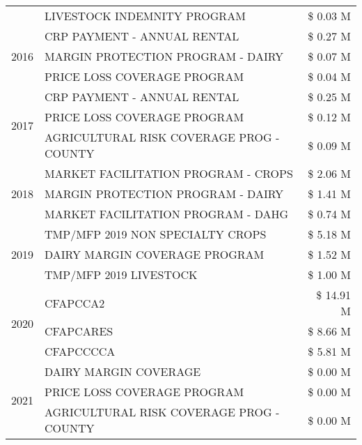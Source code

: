 \begin{tabular}{llr}
 & LIVESTOCK INDEMNITY PROGRAM & \$ 0.03 M \\
\cline{1-3}
\multirow[t]{3}{*}{2016} & CRP PAYMENT - ANNUAL RENTAL & \$ 0.27 M \\
 & MARGIN PROTECTION PROGRAM - DAIRY & \$ 0.07 M \\
 & PRICE LOSS COVERAGE PROGRAM & \$ 0.04 M \\
\cline{1-3}
\multirow[t]{3}{*}{2017} & CRP PAYMENT - ANNUAL RENTAL & \$ 0.25 M \\
 & PRICE LOSS COVERAGE PROGRAM & \$ 0.12 M \\
 & AGRICULTURAL RISK COVERAGE PROG - COUNTY & \$ 0.09 M \\
\cline{1-3}
\multirow[t]{3}{*}{2018} & MARKET FACILITATION PROGRAM - CROPS & \$ 2.06 M \\
 & MARGIN PROTECTION PROGRAM - DAIRY & \$ 1.41 M \\
 & MARKET FACILITATION PROGRAM - DAHG & \$ 0.74 M \\
\cline{1-3}
\multirow[t]{3}{*}{2019} & TMP/MFP 2019 NON SPECIALTY CROPS & \$ 5.18 M \\
 & DAIRY MARGIN COVERAGE PROGRAM & \$ 1.52 M \\
 & TMP/MFP 2019 LIVESTOCK & \$ 1.00 M \\
\cline{1-3}
\multirow[t]{3}{*}{2020} & CFAPCCA2 & \$ 14.91 M \\
 & CFAPCARES & \$ 8.66 M \\
 & CFAPCCCCA & \$ 5.81 M \\
\cline{1-3}
\multirow[t]{3}{*}{2021} & DAIRY MARGIN COVERAGE & \$ 0.00 M \\
 & PRICE LOSS COVERAGE PROGRAM & \$ 0.00 M \\
 & AGRICULTURAL RISK COVERAGE PROG - COUNTY & \$ 0.00 M \\
\cline{1-3}
\bottomrule
\end{tabular}
